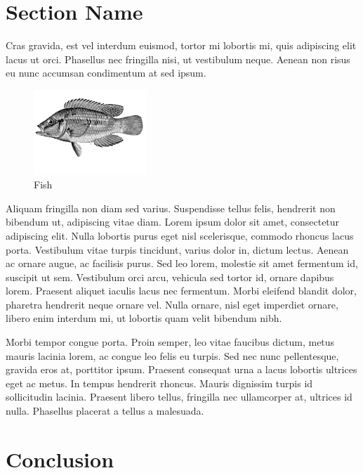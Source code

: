 \documentclass[a4paper, 12pt]{article} %
\begin{document}
\section*{Section Name}

Cras gravida, est vel interdum euismod, tortor mi lobortis mi, quis adipiscing elit lacus ut orci. Phasellus nec fringilla nisi, ut vestibulum neque. Aenean non risus eu nunc accumsan condimentum at sed ipsum.
\begin{figure} %
\begin{center}
\includegraphics[width=0.38\textwidth]{fish.png}
\end{center}
\caption{Fish}
\end{figure}
Aliquam fringilla non diam sed varius. Suspendisse tellus felis, hendrerit non bibendum ut, adipiscing vitae diam. Lorem ipsum dolor sit amet, consectetur adipiscing elit. Nulla lobortis purus eget nisl scelerisque, commodo rhoncus lacus porta. Vestibulum vitae turpis tincidunt, varius dolor in, dictum lectus. Aenean ac ornare augue, ac facilisis purus. Sed leo lorem, molestie sit amet fermentum id, suscipit ut sem. Vestibulum orci arcu, vehicula sed tortor id, ornare dapibus lorem. Praesent aliquet iaculis lacus nec fermentum. Morbi eleifend blandit dolor, pharetra hendrerit neque ornare vel. Nulla ornare, nisl eget imperdiet ornare, libero enim interdum mi, ut lobortis quam velit bibendum nibh.

Morbi tempor congue porta. Proin semper, leo vitae faucibus dictum, metus mauris lacinia lorem, ac congue leo felis eu turpis. Sed nec nunc pellentesque, gravida eros at, porttitor ipsum. Praesent consequat urna a lacus lobortis ultrices eget ac metus. In tempus hendrerit rhoncus. Mauris dignissim turpis id sollicitudin lacinia. Praesent libero tellus, fringilla nec ullamcorper at, ultrices id nulla. Phasellus placerat a tellus a malesuada.


\section*{Conclusion}
\end{document}
